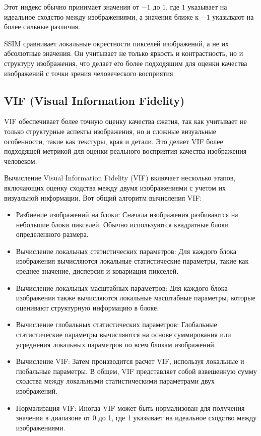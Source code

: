 
Этот индекс обычно принимает значения от $-1$ до $1$, где $1$ указывает на
идеальное сходство между изображениями, а значения ближе к $-1$ указывают на
более сильные различия.


SSIM сравнивает локальные окрестности пикселей изображений, а не их абсолютные
значения. Он учитывает не только яркость и контрастность, но и структуру
изображения, что делает его более подходящим для оценки качества изображений с
точки зрения человеческого восприятия


\subsection{VIF (Visual Information Fidelity)}

VIF обеспечивает более точную оценку качества сжатия, так как учитывает не
только структурные аспекты изображения, но и сложные визуальные особенности,
такие как текстуры, края и детали. Это делает VIF более подходящей метрикой для
оценки реального восприятия качества изображения человеком.


Вычисление Visual Information Fidelity (VIF) включает несколько этапов,
включающих оценку сходства между двумя изображениями с учетом их визуальной
информации. Вот общий алгоритм вычисления VIF:

\begin{itemize}
    \item Разбиение изображений на блоки: Сначала изображения разбиваются на
    небольшие блоки пикселей. Обычно используются квадратные блоки определенного
    размера.
    \item Вычисление локальных статистических параметров: Для каждого блока
    изображения вычисляются локальные статистические параметры, такие как
    среднее значение, дисперсия и ковариация пикселей.
    \item Вычисление локальных масштабных параметров: Для каждого блока
    изображения также вычисляются локальные масштабные параметры, которые
    оценивают структурную информацию в блоке.
    \item Вычисление глобальных статистических параметров: Глобальные
    статистические параметры вычисляются на основе суммирования или усреднения
    локальных параметров по всем блокам изображений.
    \item Вычисление VIF: Затем производится расчет VIF, используя локальные
    и глобальные параметры. В общем, VIF представляет собой взвешенную сумму
    сходства между локальными статистическими параметрами двух изображений.
    \item Нормализация VIF: Иногда VIF может быть нормализован для получения
    значения в диапазоне от 0 до 1, где 1 указывает на идеальное сходство между
    изображениями.
\end{itemize}

